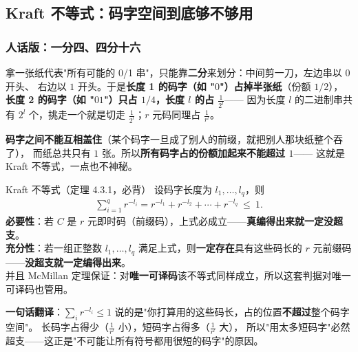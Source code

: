 \subsection{Kraft 不等式：码字空间到底够不够用}

\subsubsection{人话版：一分四、四分十六}
拿一张纸代表"所有可能的 0/1 串"，只能靠\textbf{二分}来划分：中间剪一刀，左边串以 $0$ 开头、
右边以 $1$ 开头。于是\textbf{长度 1 的码字（如 "$0$"）占掉半张纸}（份额 $1/2$），
\textbf{长度 2 的码字（如 "$01$"）只占 $1/4$，长度 $l$ 的占 $\frac{1}{2^l}$}——
因为长度 $l$ 的二进制串共有 $2^l$ 个，挑走一个就是切走 $\frac{1}{2^l}$；$r$ 元码同理占 $\frac{1}{r^l}$。

\textbf{码字之间不能互相盖住}（某个码字一旦成了别人的前缀，就把别人那块纸整个吞了），
而纸总共只有 $1$ 张。所以\textbf{所有码字占的份额加起来不能超过 $1$}——
这就是 Kraft 不等式，一点也不神秘。

\begin{defbox}{Kraft 不等式（定理 4.3.1，必背）}
设码字长度为 $l_1,\dots,l_q$，则
\begin{align*}
\sum_{i=1}^{q}r^{-l_i}=r^{-l_1}+r^{-l_2}+\cdots+r^{-l_q}\ \le\ 1 .
\end{align*}
\textbf{必要性}：若 $C$ 是 $r$ 元即时码（前缀码），上式必成立——\textbf{真编得出来就一定没超支}。\\
\textbf{充分性}：若一组正整数 $l_1,\dots,l_q$ 满足上式，则\textbf{一定存在}具有这些码长的
$r$ 元前缀码——\textbf{没超支就一定编得出来}。\\
并且 McMillan 定理保证：对\textbf{唯一可译码}该不等式同样成立，所以这套判据对唯一可译码也管用。
\end{defbox}

\textbf{一句话翻译}：$\sum_i r^{-l_i}\le1$ 说的是"你打算用的这些码长，占的位置\textbf{不超过}整个码字空间"。
长码字占得少（$\frac{1}{r^l}$ 小），短码字占得多（$\frac{1}{r^l}$ 大），
所以"用太多短码字"必然超支——这正是"不可能让所有符号都用很短的码字"的原因。

